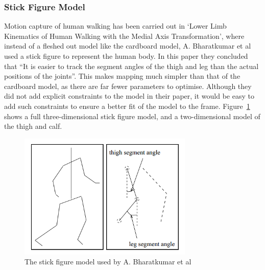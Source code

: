 \subsubsection{Stick Figure Model}

Motion capture of human walking has been carried out in `Lower Limb Kinematics of Human Walking with the Medial Axis Transformation'\cite{stickfigure}, where instead of a fleshed out model like the cardboard model, A. Bharatkumar et al used a stick figure to represent the human body. In this paper they concluded that ``It is easier to track the segment angles of the thigh and leg than the actual positions of the joints''. This makes mapping much simpler than that of the cardboard model, as there are far fewer parameters to optimise. Although they did not add explicit constraints to the model in their paper, it would be easy to add such constraints to ensure a better fit of the model to the frame. Figure~\ref{fig:stickfiguremodel} shows a full three-dimensional stick figure model, and a two-dimensional model of the thigh and calf.

\begin{figure}[H]
    \centering
    \includegraphics[height=6cm]{background/images/stickfigure}

	\caption{The stick figure model used by A. Bharatkumar et al\cite{stickfigure}}
	\label{fig:stickfiguremodel}
\end{figure}